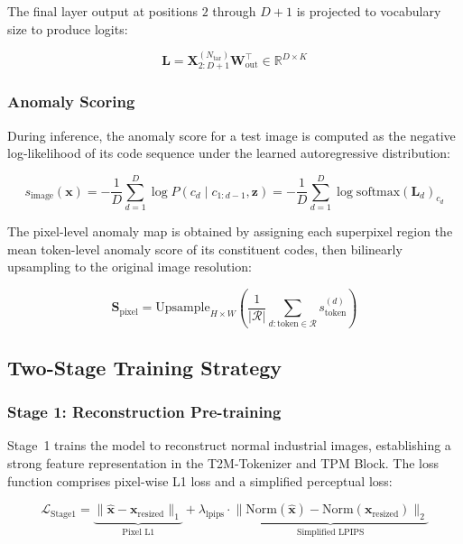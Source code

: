 \documentclass[lettersize,journal]{IEEEtran}
\begin{document}
The final layer output at positions $2$ through $D+1$ is projected to vocabulary size to produce logits:

\begin{equation}
\label{eq:tar_logits}
\mathbf{L} = \mathbf{X}^{(N_{\text{tar}})}_{2:D+1} \mathbf{W}_{\text{out}}^\top \in \mathbb{R}^{D \times K}
\end{equation}

\subsubsection{Anomaly Scoring}

During inference, the anomaly score for a test image is computed as the negative log-likelihood of its code sequence under the learned autoregressive distribution:

\begin{equation}
\label{eq:anomaly_score}
s_{\text{image}}(\mathbf{x}) = -\frac{1}{D} \sum_{d=1}^{D} \log P(c_d \mid c_{1:d-1}, \mathbf{z}) = -\frac{1}{D} \sum_{d=1}^{D} \log \text{softmax}(\mathbf{L}_{d})_{c_d}
\end{equation}

The pixel-level anomaly map is obtained by assigning each superpixel region the mean token-level anomaly score of its constituent codes, then bilinearly upsampling to the original image resolution:

\begin{equation}
\label{eq:pixel_score}
\mathbf{S}_{\text{pixel}} = \text{Upsample}_{H \times W}\left(\frac{1}{|\mathcal{R}|} \sum_{d: \text{token} \in \mathcal{R}} s_{\text{token}}^{(d)}\right)
\end{equation}

\subsection{Two-Stage Training Strategy}

\subsubsection{Stage 1: Reconstruction Pre-training}

Stage~1 trains the model to reconstruct normal industrial images, establishing a strong feature representation in the T2M-Tokenizer and TPM Block. The loss function comprises pixel-wise L1 loss and a simplified perceptual loss:

\begin{equation}
\label{eq:loss_stage1}
\mathcal{L}_{\text{Stage1}} = \underbrace{\|\hat{\mathbf{x}} - \mathbf{x}_{\text{resized}}\|_1}_{\text{Pixel L1}} + \lambda_{\text{lpips}} \cdot \underbrace{\|\text{Norm}(\hat{\mathbf{x}}) - \text{Norm}(\mathbf{x}_{\text{resized}})\|_2}_{\text{Simplified LPIPS}}
\end{equation}
\end{document}
